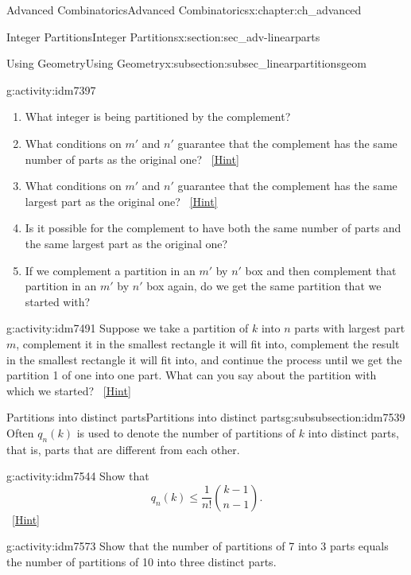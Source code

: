\documentclass[oneside,10pt,]{book}
\numberwithin{equation}{chapter}
\begin{document}
\begin{chapterptx}{Advanced Combinatorics}{}{Advanced Combinatorics}{}{}{x:chapter:ch_advanced}
\begin{sectionptx}{Integer Partitions}{}{Integer Partitions}{}{}{x:section:sec_adv-linearparts}
\begin{subsectionptx}{Using Geometry}{}{Using Geometry}{}{}{x:subsection:subsec_linearpartitionsgeom}
\begin{introduction}{}
\begin{activity}{}{g:activity:idm7397}
\begin{enumerate}[font=\bfseries,label=(\alph*),ref=\alph*]
\item{}What integer is being partitioned by the complement?%
\item{}What conditions on \(m'\) and \(n'\) guarantee that the complement has the same number of parts as the original one?%
\qquad~\hfill{\tiny\hyperlink{g:hint:idm7434-back}{[Hint]}}\item{}What conditions on \(m'\) and \(n'\) guarantee that the complement has the same largest part as the original one?%
\qquad~\hfill{\tiny\hyperlink{g:hint:idm7451-back}{[Hint]}}\item{}Is it possible for the complement to have both the same number of parts and the same largest part as the original one?%
\item{}If we complement a partition in an \(m'\) by \(n'\) box and then complement that partition in an \(m'\) by \(n'\) box again, do we get the same partition that we started with?%
\end{enumerate}
\end{activity}
\begin{activity}{}{g:activity:idm7491}%
Suppose we take a partition of \(k\) into \(n\) parts with largest part \(m\), complement it in the smallest rectangle it will fit into, complement the result in the smallest rectangle it will fit into, and continue the process until we get the partition 1 of one into one part.  What can you say about the partition with which we started?%
\qquad~\hfill{\tiny\hyperlink{g:hint:idm7497-back}{[Hint]}}\end{activity}
\end{introduction}%
%
%
\typeout{************************************************}
\typeout{************************************************}
%
\begin{subsubsectionptx}{Partitions into distinct parts}{}{Partitions into distinct parts}{}{}{g:subsubsection:idm7539}
Often \(q_n(k)\) is used to denote the number of partitions of \(k\) into distinct parts, that is, parts that are different from each other.%
\begin{activity}{}{g:activity:idm7544}%
Show that%
\begin{equation*}
q_n(k) \le \frac{1}{n!}\binom{k-1}{n-1}.
\end{equation*}
%
\qquad~\hfill{\tiny\hyperlink{g:hint:idm7548-back}{[Hint]}}\end{activity}
\begin{activity}{}{g:activity:idm7573}%
Show that the number of partitions of 7 into 3 parts equals the number of partitions of 10 into three distinct parts.%

\end{activity}
\end{subsubsectionptx}
\end{subsectionptx}
\end{sectionptx}
\end{chapterptx}
\end{document}
